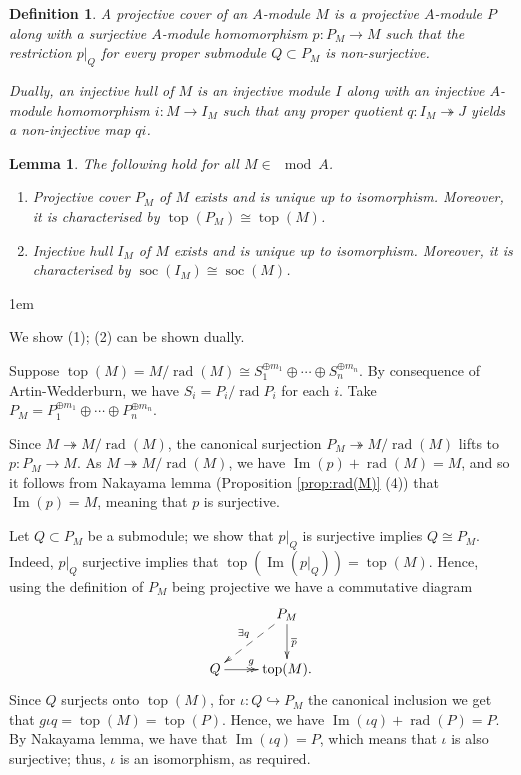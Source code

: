 \documentclass[11pt,a4paper]{article}
\makeatletter
\numberwithin{equation}{section}
\renewenvironment{proof}[1][\proofname]{\par
    \pushQED{\qed}%
    \normalfont \topsep0\p@\@plus6\p@ \labelsep1em\relax
    \trivlist
    \item[\hskip\labelsep\indent
        \bfseries #1]\ignorespaces
    \mbox{}
}{
    \popQED\endtrivlist\@endpefalse
}
\theoremstyle{all}
\newtheorem{lemma}[theorem]{Lemma}
\newtheorem{definition}[theorem]{Definition}
\theoremstyle{remark}
\newcommand{\soc}{\operatorname{soc}\nolimits}
\newcommand{\rad}{\operatorname{rad}\nolimits}
\renewcommand{\top}{\operatorname{top}\nolimits}
\renewcommand{\Im}{\operatorname{Im}\nolimits}
\newcommand{\defn}[1]{\textsl{\color{darkblue} #1}}
\makeatother
\begin{document}
\begin{definition}
A \defn{projective cover} of an $A$-module $M$ is a projective $A$-module $P$ along with a surjective $A$-module homomorphism $p:P_M\to M$ such that the restriction $p|_Q$ for every proper submodule $Q\subset P_M$ is non-surjective.

Dually, an \defn{injective hull} of $M$ is an injective module $I$ along with an injective $A$-module homomorphism $i:M\to I_M$ such that any proper quotient $q:I_M\twoheadrightarrow J$ yields a non-injective map $qi$.
\end{definition}

\begin{lemma}
The following hold for all $M\in \mod A$.
\begin{enumerate}[(1)]
\item Projective cover $P_M$ of $M$ exists and is unique up to isomorphism.  Moreover, it is characterised by $\top(P_M)\cong \top(M)$.

\item Injective hull $I_M$ of $M$ exists and is unique up to isomorphism.  Moreover, it is characterised by $\soc(I_M)\cong \soc(M)$.
\end{enumerate}
\end{lemma}
\begin{proof}
We show (1); (2) can be shown dually.

Suppose $\top(M)=M/\rad(M)\cong S_1^{\oplus m_1}\oplus\cdots \oplus S_n^{\oplus m_n}$.  By consequence of Artin-Wedderburn, we have $S_i = P_i/\rad P_i$ for each $i$.  Take $P_M=P_1^{\oplus m_1}\oplus \cdots \oplus P_n^{\oplus m_n}$.

Since $M\twoheadrightarrow M/\rad(M)$, the canonical surjection $P_M\twoheadrightarrow M/\rad(M)$ lifts to $p:P_M\to M$. 
As $M\twoheadrightarrow M/\rad(M)$, we have $\Im(p)+\rad(M)=M$, and so it follows from Nakayama lemma (Proposition \ref{prop:rad(M)} (4)) that $\Im(p)=M$, meaning that $p$ is surjective.

Let $Q\subset P_M$ be a submodule; we show that $p|_Q$ is surjective implies $Q\cong P_M$.
Indeed, $p|_Q$ surjective implies that $\top(\Im(p|_Q))=\top(M)$.  
Hence, using the definition of $P_M$ being projective we have a commutative diagram
\[
\xymatrix{ & P_M\ar@{-->}[ld]_{\exists q} \ar[d]^{\overline{p}}  \\
Q \ar@{->>}[r]^{g} & \top(M).
}
\]
Since $Q$ surjects onto $\top(M)$, for $\iota:Q\hookrightarrow P_M$ the canonical inclusion we get that $g\iota q = \top(M)=\top(P)$.
Hence, we have $\Im(\iota q)+\rad(P)= P$.
By Nakayama lemma, we have that $\Im(\iota q)=P$, which means that $\iota$ is also surjective; thus, $\iota$ is an isomorphism, as required.
\end{proof}
\end{document}

